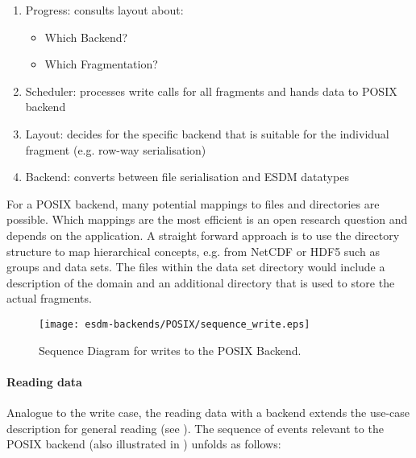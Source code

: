 \begin{enumerate}
	\item Progress: consults layout about:
	\begin{itemize}
		\item Which Backend?
		\item Which Fragmentation?
	\end{itemize}
	\item Scheduler: processes write calls for all fragments and hands data to POSIX backend
	\item Layout: decides for the specific backend that is suitable for the individual fragment (e.g. row-way serialisation)
	\item Backend: converts between file serialisation and ESDM datatypes
\end{enumerate}

For a POSIX backend, many potential mappings to files and directories are possible.
Which mappings are the most efficient is an open research question and depends on the application.
A straight forward approach is to use the directory structure to map hierarchical concepts, e.g. from NetCDF or HDF5 such as groups and data sets.
The files within the data set directory would include a description of the domain and an additional directory that is used to store the actual fragments.

\begin{figure}
	\centering
	\texttt{[image: esdm-backends/POSIX/sequence\_write.eps]}
	\caption{Sequence Diagram for writes to the POSIX Backend.}
	\label{fig:backend posix sequence write}
\end{figure}



\paragraph{Reading data}

Analogue to the write case, the reading data with a backend extends the use-case description for general reading (see ).
The sequence of events relevant to the POSIX backend (also illustrated in ) unfolds as follows:

